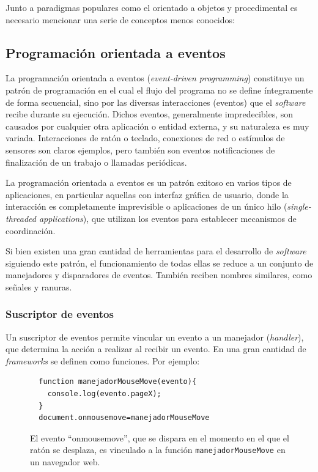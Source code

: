 Junto a paradigmas populares como el orientado a objetos y procedimental es necesario mencionar una serie de conceptos menos conocidos:

\subsection{Programación orientada a eventos}
\label{teoria:eventdriven}

La programación orientada a eventos (\textit{event-driven programming}) constituye un patrón de programación en el cual el flujo del programa no se define íntegramente de forma secuencial, sino por las diversas interacciones (eventos) que el \textit{software} recibe durante su ejecución. Dichos eventos, generalmente impredecibles, son causados por cualquier otra aplicación o entidad externa, y su naturaleza es muy variada. Interacciones de ratón o teclado, conexiones de red o estímulos de sensores son claros ejemplos, pero también son eventos notificaciones de finalización de un trabajo o llamadas periódicas.

La programación orientada a eventos es un patrón exitoso en varios tipos de aplicaciones, en particular aquellas con interfaz gráfica de usuario, donde la interacción es completamente imprevisible o aplicaciones de un único hilo (\textit{single-threaded applications}), que utilizan los eventos para establecer mecanismos de coordinación. 

Si bien existen una gran cantidad de herramientas para el desarrollo de \textit{software} siguiendo este patrón, el funcionamiento de todas ellas se reduce a un conjunto de manejadores y disparadores de eventos. También reciben nombres similares, como señales y ranuras.

\subsubsection{Suscriptor de eventos}

Un suscriptor de eventos permite vincular un evento a un manejador (\textit{handler}), que determina la acción a realizar al recibir un evento. En una gran cantidad de \textit{frameworks} se definen como funciones. Por ejemplo:

\begin{figure}[H]
\centering
  \begin{lstlisting}
  function manejadorMouseMove(evento){
    console.log(evento.pageX);
  }
  document.onmousemove=manejadorMouseMove
  \end{lstlisting}
\caption[Ejemplo de evento y manejador]{El evento ``onmousemove'', que se dispara en el momento en el que el ratón se desplaza, es vinculado a la función \texttt{manejadorMouseMove} en un navegador web.}
\end{figure}

